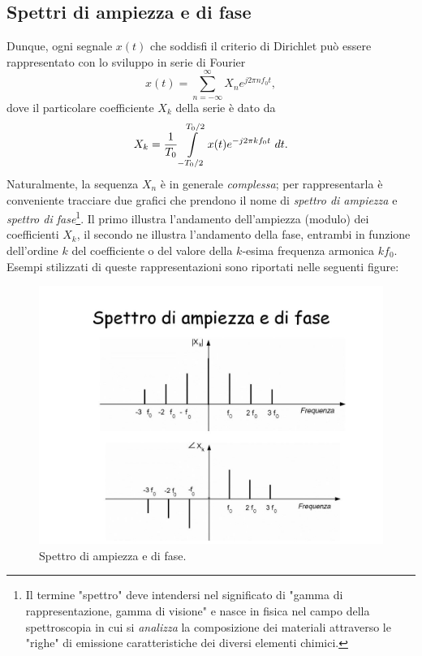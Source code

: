 \documentclass[12pt,oneside,openany]{memoir}
\numberwithin{equation}{subsection}
\newcommand{\dt}{\ dt}
\begin{document}
\subsection{Spettri di ampiezza e di fase}
Dunque, ogni segnale $x(t)$ che soddisfi il criterio di Dirichlet pu\`o essere rappresentato con lo sviluppo in serie di Fourier
\begin{equation}
	x(t) = \sum_{n = -\infty}^{\infty} X_n e^{j 2 \pi n f_0 t},
\end{equation}
dove il particolare coefficiente $X_k$ della serie \`e dato da
\begin{equation}
	X_k = \frac{1}{T_0} \int\displaylimits_{-T_0/2}^{T_0/2} x(t) e^{-j 2 \pi k f_0 t} \dt.
\end{equation}
Naturalmente, la sequenza $X_n$ \`e in generale \textit{complessa}; per rappresentarla \`e conveniente tracciare due grafici che prendono il nome di \textit{spettro di ampiezza} e \textit{spettro di fase}\footnote{Il termine "spettro" deve intendersi nel significato di "gamma di rappresentazione, gamma di visione" e nasce in fisica nel campo della spettroscopia in cui si \textit{analizza} la composizione dei materiali attraverso le "righe" di emissione caratteristiche dei diversi elementi chimici.}. Il primo illustra l'andamento dell'ampiezza (modulo) dei coefficienti $X_k$, il secondo ne illustra l'andamento della fase, entrambi in funzione dell'ordine $k$ del coefficiente o del valore della $k$-esima frequenza armonica $k f_0$. Esempi stilizzati di queste rappresentazioni sono riportati nelle seguenti figure:
\begin{figure}[H]
\centering
\captionsetup{justification=centering}
\includegraphics[width=1.0\textwidth]{images/spettro_di_ampiezza_e_di_fase.jpg}
\caption{Spettro di ampiezza e di fase.}
\end{figure}
\end{document}
